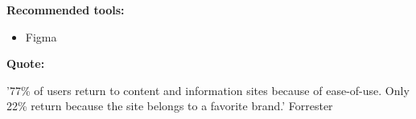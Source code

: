 \textbf{Recommended tools:}

\begin{itemize}
\item Figma
\end{itemize}

\textbf{Quote:}

'77\% of users return to content and information sites because of ease-of-use. Only 22\% return because the site belongs to a favorite brand.' Forrester

